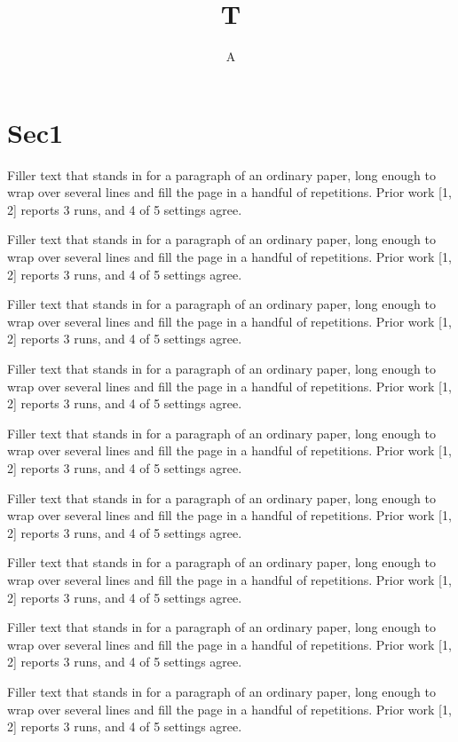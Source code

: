 \documentclass{article}
\title{T}\author{A}
\begin{document}
\maketitle
\section{Sec1}
Filler text that stands in for a paragraph of an ordinary paper, long enough to wrap over several lines and fill the page in a handful of repetitions. Prior work [1, 2] reports 3 runs, and 4 of 5 settings agree.\par
Filler text that stands in for a paragraph of an ordinary paper, long enough to wrap over several lines and fill the page in a handful of repetitions. Prior work [1, 2] reports 3 runs, and 4 of 5 settings agree.\par
Filler text that stands in for a paragraph of an ordinary paper, long enough to wrap over several lines and fill the page in a handful of repetitions. Prior work [1, 2] reports 3 runs, and 4 of 5 settings agree.\par
Filler text that stands in for a paragraph of an ordinary paper, long enough to wrap over several lines and fill the page in a handful of repetitions. Prior work [1, 2] reports 3 runs, and 4 of 5 settings agree.\par
Filler text that stands in for a paragraph of an ordinary paper, long enough to wrap over several lines and fill the page in a handful of repetitions. Prior work [1, 2] reports 3 runs, and 4 of 5 settings agree.\par
Filler text that stands in for a paragraph of an ordinary paper, long enough to wrap over several lines and fill the page in a handful of repetitions. Prior work [1, 2] reports 3 runs, and 4 of 5 settings agree.\par
Filler text that stands in for a paragraph of an ordinary paper, long enough to wrap over several lines and fill the page in a handful of repetitions. Prior work [1, 2] reports 3 runs, and 4 of 5 settings agree.\par
Filler text that stands in for a paragraph of an ordinary paper, long enough to wrap over several lines and fill the page in a handful of repetitions. Prior work [1, 2] reports 3 runs, and 4 of 5 settings agree.\par
Filler text that stands in for a paragraph of an ordinary paper, long enough to wrap over several lines and fill the page in a handful of repetitions. Prior work [1, 2] reports 3 runs, and 4 of 5 settings agree.\par
\end{document}
